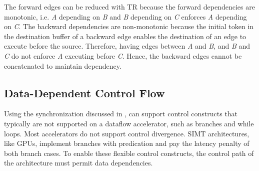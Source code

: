 The forward edges can be reduced with TR because the forward dependencies
are monotonic, i.e. \emph{A} depending on \emph{B} and \emph{B} depending on \emph{C}
enforces \emph{A} depending on \emph{C}. The backward dependencies are non-monotonic because the initial
token in the destination buffer of a backward edge enables the destination of an edge to execute
before the source. 
Therefore, having edges between \emph{A} and \emph{B}, and \emph{B} and \emph{C} do not
enforce \emph{A} executing before \emph{C}. Hence, the backward edges cannot be concatenated to
maintain dependency.



\subsection{Data-Dependent Control Flow} \label{sec:datactrl}
Using the synchronization discussed in , \name can support control constructs that 
typically are not supported on a dataflow accelerator, such as branches and while loops.
Most accelerators do not support control divergence. SIMT architectures, like GPUs,
implement branches with predication and pay the latency penalty of both branch cases.
To enable these flexible control constructs, the control path of the architecture must permit data dependencies.

